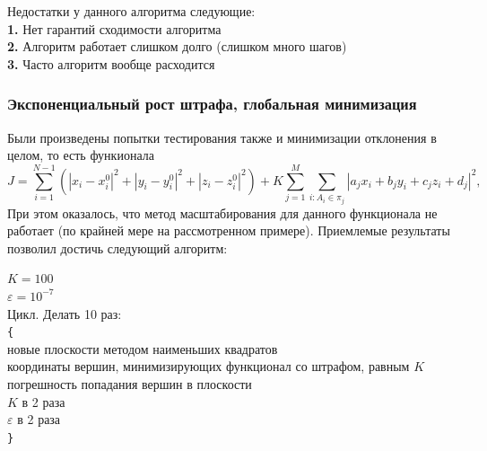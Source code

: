 \documentclass[a4paper,12pt, titlepage]{article}
\begin{document}
\begin{flushleft}
Недостатки у данного алгоритма следующие:\\
 	\textbf{1. }Нет гарантий сходимости алгоритма\\
	\textbf{2. }Алгоритм работает слишком долго (слишком много шагов)\\
	\textbf{3. }Часто алгоритм вообще расходится\\
\end{flushleft}

\subsubsection{Экспоненциальный рост штрафа, глобальная минимизация}
\begin{flushleft}
  Были произведены попытки тестирования также и минимизации отклонения в целом, то есть функионала
$$
	J = \sum\limits_{i = 1}^{N - 1}(|x_{i} - x_{i}^{0}|^{2} + |y_{i} - y_{i}^{0}|^{2} 
	+ |z_{i} - z_{i}^{0}|^{2}) + 
	K\sum\limits_{j = 1}^{M}\sum\limits_{i: A_{i} \in \pi_{j}}
	|a_{j}x_{i} + b_{j}y_{i} + c_{j}z_{i} + d_{j}|^{2},
$$
При этом оказалось, что метод масштабирования для данного функционала не работает (по крайней мере на
рассмотренном примере). Приемлемые результаты позволил достичь следующий алгоритм:
\end{flushleft}

\begin{flushleft}
$K = 100$\\
$\varepsilon = 10^{-7}$\\
Цикл. Делать 10 раз:\\
\verb"{"\\
 новые плоскости методом наименьших квадратов\\
 координаты вершин, минимизирующих функционал со штрафом, равным $K$\\
 погрешность попадания вершин в плоскости\\
 $K$ в 2 раза\\
 $\varepsilon$ в 2 раза\\
\verb"}"\\
\end{flushleft}
\end{document}
